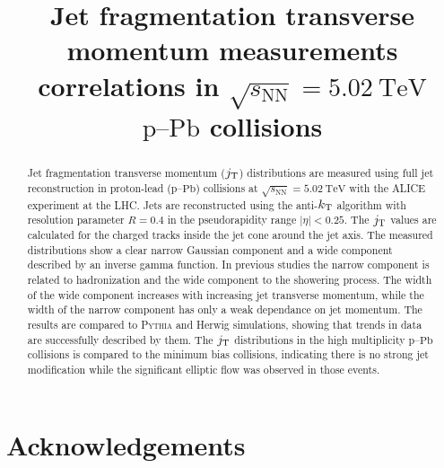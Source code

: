 \documentclass[ALICE,manyauthors]{cernphprep}
\newcommand{\pPb}{\ensuremath{\mbox{p--Pb}}}
\newcommand{\sqrtSnn}{\ensuremath{\sqrt{s_{\mathrm{NN}}}}}
\newcommand{\sqrtSnnE}[2][TeV]{\ensuremath{\sqrtSnn = #2~\mathrm{#1}}}
\def\jt#1{\ensuremath{j_{\rm T#1}}}
\def\kt#1{\ensuremath{k_{\rm T#1}}}
\begin{document}
\begin{titlepage}
%
%

\title{Jet fragmentation transverse momentum measurements correlations in $\sqrtSnnE{5.02}$ $\pPb$ collisions}


\begin{abstract}
Jet fragmentation transverse momentum ($\jt{}$) distributions are measured using full jet reconstruction in proton-lead (\pPb) collisions at $\sqrtSnnE{5.02}$ with the ALICE experiment at the LHC. Jets are reconstructed using the anti-$\kt{}$ algorithm with resolution parameter $R=0.4$ in the pseudorapidity range $|\eta|<0.25$. The $\jt{}$ values are calculated for the charged tracks inside the jet cone around the jet axis. The measured distributions show a clear narrow Gaussian component and a wide component described by an inverse gamma function. In previous studies the narrow component is related to hadronization and the wide component to the showering process. The width of the wide component increases with increasing jet transverse momentum, while the width of the narrow component has only a weak dependance on jet momentum. The results are compared to \textsc{Pythia} and Herwig simulations, showing that trends in data are successfully described by them. The $\jt{}$ distributions in the high multiplicity $\pPb$ collisions is compared to the minimum bias collisions, indicating there is no strong jet modification while the significant elliptic flow was observed in those events.
\end{abstract}
\end{titlepage}
\setcounter{page}{2}

 


\newenvironment{acknowledgement}{\relax}{\relax}
\begin{acknowledgement}
\section*{Acknowledgements}
\end{acknowledgement}
\end{document}
